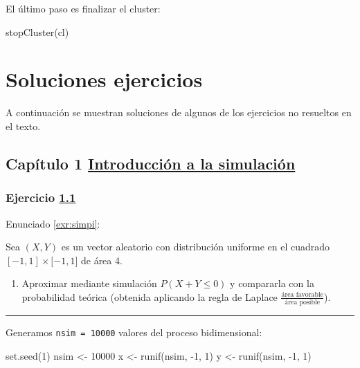 \documentclass[
]{book}
\newenvironment{Shaded}{\begin{snugshade}}{\end{snugshade}}
\newcommand{\DecValTok}[1]{\textcolor[rgb]{0.00,0.00,0.81}{#1}}
\newcommand{\FunctionTok}[1]{\textcolor[rgb]{0.00,0.00,0.00}{#1}}
\newcommand{\NormalTok}[1]{#1}
\newcommand{\OtherTok}[1]{\textcolor[rgb]{0.56,0.35,0.01}{#1}}
\newcommand{\SpecialCharTok}[1]{\textcolor[rgb]{0.00,0.00,0.00}{#1}}
\providecommand{\tightlist}{%
  \setlength{\itemsep}{0pt}\setlength{\parskip}{0pt}}
\theoremstyle{break}
\theoremstyle{nonumberplain}
\begin{document}
El último paso es finalizar el cluster:

\begin{Shaded}
\begin{Highlighting}[]
\FunctionTok{stopCluster}\NormalTok{(cl)}
\end{Highlighting}
\end{Shaded}

\hypertarget{soluciones}{%
\chapter{Soluciones ejercicios}\label{soluciones}}

A continuación se muestran soluciones de algunos de los ejercicios no resueltos en el texto.

\hypertarget{capuxedtulo-1-introducciuxf3n-a-la-simulaciuxf3n}{%
\section{\texorpdfstring{Capítulo 1 \href{intro.html}{Introducción a la simulación}}{Capítulo 1 Introducción a la simulación}}\label{capuxedtulo-1-introducciuxf3n-a-la-simulaciuxf3n}}

\hypertarget{sol-simpi}{%
\subsection{\texorpdfstring{Ejercicio \href{ejercicios.html\#exr:simpi}{1.1}}{Ejercicio 1.1}}\label{sol-simpi}}

Enunciado \ref{exr:simpi}:

Sea \((X,Y)\) es un vector aleatorio con distribución uniforme en el
cuadrado \([-1,1]\times\lbrack-1,1]\) de área 4.

\begin{enumerate}
\def\labelenumi{\alph{enumi})}
\tightlist
\item
  Aproximar mediante simulación \(P\left(X + Y \leq 0 \right)\) y
  compararla con la probabilidad teórica (obtenida aplicando la
  regla de Laplace \(\frac{\text{área favorable}}{\text{área posible}}\)).
\end{enumerate}

\begin{center}\rule{0.5\linewidth}{0.5pt}\end{center}

Generamos \texttt{nsim\ =\ 10000} valores del proceso bidimensional:

\begin{Shaded}
\begin{Highlighting}[]
\FunctionTok{set.seed}\NormalTok{(}\DecValTok{1}\NormalTok{)}
\NormalTok{nsim }\OtherTok{\textless{}{-}} \DecValTok{10000}
\NormalTok{x }\OtherTok{\textless{}{-}} \FunctionTok{runif}\NormalTok{(nsim, }\SpecialCharTok{{-}}\DecValTok{1}\NormalTok{, }\DecValTok{1}\NormalTok{)}
\NormalTok{y }\OtherTok{\textless{}{-}} \FunctionTok{runif}\NormalTok{(nsim, }\SpecialCharTok{{-}}\DecValTok{1}\NormalTok{, }\DecValTok{1}\NormalTok{)}
\end{Highlighting}
\end{Shaded}
\end{document}

